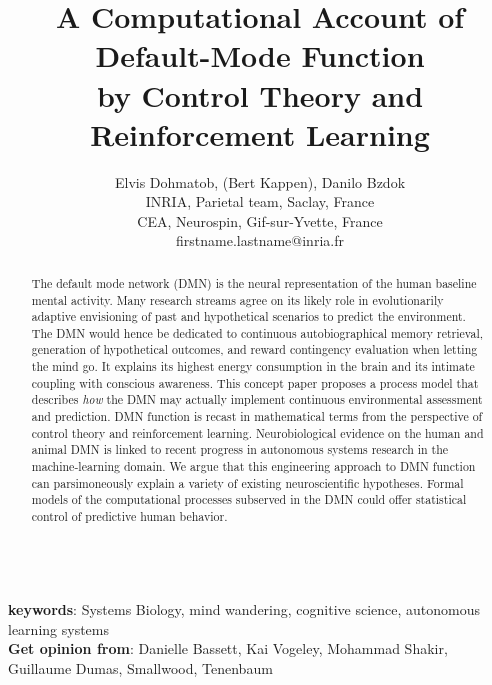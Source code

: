 \documentclass{article} %
\title{A Computational Account of Default-Mode Function\\
by Control Theory and Reinforcement Learning}
\begin{document}
\author{Elvis Dohmatob, (Bert Kappen), Danilo Bzdok\\
  INRIA, Parietal team, Saclay, France\\
  CEA, Neurospin, Gif-sur-Yvette, France\\
  firstname.lastname@inria.fr}

\maketitle


\begin{abstract}
The default mode network (DMN) is the neural representation of the human
baseline mental activity.
%
Many research streams agree on its likely role in evolutionarily adaptive
envisioning of past and hypothetical scenarios to predict the environment.
The DMN would hence be dedicated to continuous autobiographical memory retrieval,
generation of hypothetical outcomes,
and reward contingency evaluation when letting the mind go.
It explains its highest energy consumption in the brain and
its intimate coupling with conscious awareness.
%
This concept paper proposes a process model that describes
\textit{how} the DMN may actually implement continuous
environmental assessment and prediction.
DMN function is recast in mathematical terms
from the perspective of control theory and
reinforcement learning.
Neurobiological evidence on the human and animal DMN
is linked to recent progress in autonomous systems research
in the machine-learning domain.
We argue that this engineering approach to DMN function can parsimoneously
explain a variety of existing neuroscientific hypotheses.
%
Formal models of the computational processes subserved in the DMN
could offer statistical control of predictive human behavior.

\end{abstract}

\textbf{\\keywords}: Systems Biology, mind wandering, cognitive science,
autonomous learning systems
\textbf{\\Get opinion from}: Danielle Bassett, Kai Vogeley, Mohammad Shakir,
Guillaume Dumas, Smallwood, Tenenbaum

\tableofcontents
\end{document}
